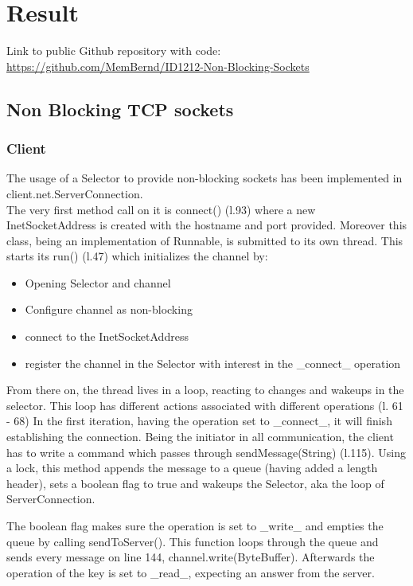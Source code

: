 \documentclass[a4paper]{scrartcl}
\begin{document}
\section{Result}


Link to public Github repository with code:
\href{https://github.com/MemBernd/ID1212-Non-Blocking-Sockets}{https://github.com/MemBernd/ID1212-Non-Blocking-Sockets}

\subsection{Non Blocking TCP sockets}

\subsubsection{Client}

The usage of a Selector to provide non-blocking sockets has been implemented in client.net.ServerConnection.
\\The very first method call on it is connect() (l.93) where a new InetSocketAddress is created with the hostname and port provided.
Moreover this class, being an implementation of Runnable, is submitted to its own thread.
This starts its run() (l.47) which initializes the channel by:
\begin{itemize}
        \item Opening Selector and channel
        \item Configure channel as non-blocking
        \item connect to the InetSocketAddress
        \item register the channel in the Selector with interest in the _connect_ operation
\end{itemize}
From there on, the thread lives in a loop, reacting to changes and wakeups in the selector.
This loop has different actions associated with different operations (l. 61 - 68)
In the first iteration, having the operation set to _connect_, it will finish establishing the connection.
Being the initiator in all communication, the client has to write a command which passes through sendMessage(String) (l.115).
Using a lock, this method appends the message to a queue (having added a length header), sets a boolean flag to true and wakeups the Selector, aka the loop of ServerConnection.

The boolean flag makes sure the operation is set to _write_ and empties the queue by calling sendToServer().
This function loops through the queue and sends every message on line 144, channel.write(ByteBuffer).
Afterwards the operation of the key is set to _read_, expecting an answer from the server.
\end{document}

